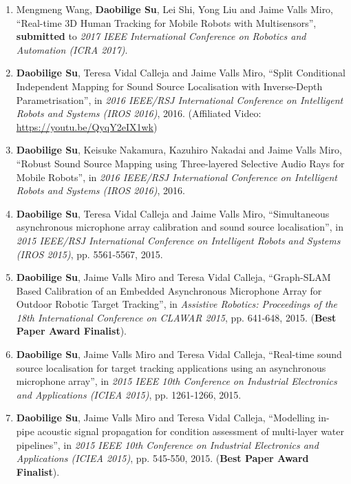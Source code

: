 \documentclass[margin,line]{res}
\begin{document}
\begin{resume}
\begin{enumerate}
\item Mengmeng Wang, {\bf Daobilige Su}, Lei Shi, Yong Liu and Jaime Valls Miro, ``Real-time 3D Human Tracking for Mobile Robots with Multisensors'', {\bf submitted} to {\it 2017 IEEE International Conference on Robotics and Automation (ICRA 2017)}.

\item {\bf Daobilige Su}, Teresa Vidal Calleja and Jaime Valls Miro, ``Split Conditional Independent Mapping for Sound Source Localisation with Inverse-Depth Parametrisation'', in {\it 2016 IEEE/RSJ International Conference on Intelligent Robots and Systems (IROS 2016)}, %
2016. (Affiliated Video: \href{https://youtu.be/QyqY2eIX1wk}{{https://youtu.be/QyqY2eIX1wk}})

\item {\bf Daobilige Su}, Keisuke Nakamura, Kazuhiro Nakadai and Jaime Valls Miro, ``Robust Sound Source Mapping using Three-layered Selective Audio Rays for Mobile Robots'', in {\it 2016 IEEE/RSJ International Conference on Intelligent Robots and Systems (IROS 2016)}, %
2016.

\item {\bf Daobilige Su}, Teresa Vidal Calleja and Jaime Valls Miro, ``Simultaneous asynchronous microphone array calibration and sound source localisation'', in {\it 2015 IEEE/RSJ International Conference on Intelligent Robots and Systems (IROS 2015)}, pp. 5561-5567, 2015.

\item {\bf Daobilige Su}, Jaime Valls Miro and Teresa Vidal Calleja, ``Graph-SLAM Based Calibration of an Embedded Asynchronous Microphone Array for Outdoor Robotic Target Tracking'', in {\it Assistive Robotics: Proceedings of the 18th International Conference on CLAWAR 2015}, pp. 641-648, 2015. ({\bf Best Paper Award Finalist}).

\item {\bf Daobilige Su}, Jaime Valls Miro and Teresa Vidal Calleja, ``Real-time sound source localisation for target tracking applications using an asynchronous microphone array'', in {\it 2015 IEEE 10th Conference on Industrial Electronics and Applications (ICIEA 2015)}, pp. 1261-1266, 2015.

\item {\bf Daobilige Su}, Jaime Valls Miro and Teresa Vidal Calleja, ``Modelling in-pipe acoustic signal propagation for condition assessment of multi-layer water pipelines'', in {\it 2015 IEEE 10th Conference on Industrial Electronics and Applications (ICIEA 2015)}, pp. 545-550, 2015. ({\bf Best Paper Award Finalist}).


\end{enumerate}
\end{resume}
\end{document}
